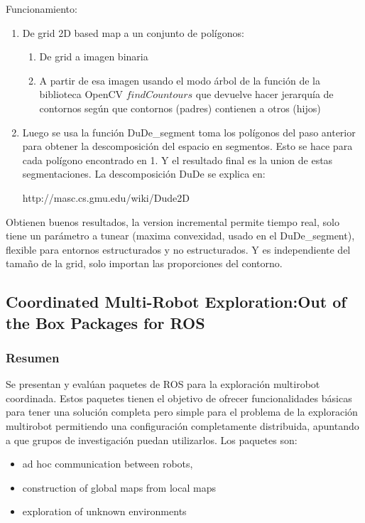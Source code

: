 Funcionamiento:
\begin{enumerate}
  \item De grid 2D based map a un conjunto de polígonos:
  \begin{enumerate}
     \item De grid a imagen binaria
     \item A partir de esa imagen usando el modo árbol de la función de la biblioteca OpenCV $findCountours$ que devuelve hacer jerarquía de contornos según que contornos (padres) contienen a otros (hijos)
  \end{enumerate}
\item Luego se usa la función DuDe\_segment toma los polígonos del paso anterior para obtener la descomposición del espacio en segmentos. Esto se hace para cada polígono encontrado en 1. Y el resultado final es la union de estas segmentaciones. La descomposición DuDe se explica en: 

  http://masc.cs.gmu.edu/wiki/Dude2D
\end{enumerate}

Obtienen buenos resultados, la version incremental permite tiempo real, solo tiene un parámetro a tunear (maxima convexidad, usado en el DuDe\_segment), flexible para entornos estructurados y no estructurados. Y es independiente del tamaño de la grid, solo importan las proporciones del contorno.

\subsection{Coordinated Multi-Robot Exploration:Out of the Box Packages for ROS}
\subsubsection{Resumen}
Se presentan y evalúan paquetes de ROS para la exploración multirobot coordinada. Estos paquetes tienen el objetivo de ofrecer funcionalidades básicas para tener una solución completa pero simple para el problema de la exploración multirobot permitiendo una configuración completamente distribuida, apuntando a que grupos de investigación puedan utilizarlos. Los paquetes son:
\begin{itemize}
  \item ad hoc communication between robots,
  \item construction of global maps from local maps
  \item exploration of unknown environments
\end{itemize}

